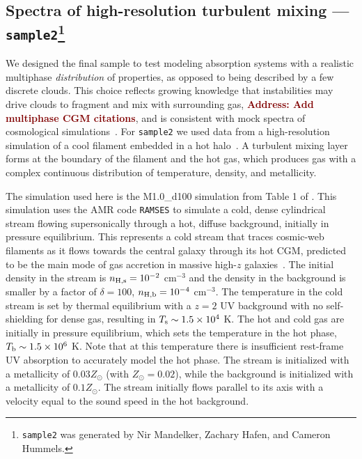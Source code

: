 \documentclass[fleqn,usenatbib]{mnras}
\newcommand{\todo}[1]{\textcolor{Maroon}{\textbf{Address: #1}}}
\begin{document}
\subsection[Spectra of high-resolution turbulent mixing --- \texttt{sample2}]{Spectra of high-resolution turbulent mixing --- \texttt{sample2}\footnote{
\texttt{sample2} was generated by Nir Mandelker, Zachary Hafen, and Cameron Hummels.}}
\label{s: data generation -- sample2}

We designed the final sample to test modeling absorption systems with a realistic multiphase \textit{distribution} of properties, as opposed to being described by a few discrete clouds.
This choice reflects growing knowledge that instabilities may drive clouds to fragment and mix with surrounding gas, \todo{Add multiphase CGM citations}, and is consistent with mock spectra of cosmological simulations~\citep[e.g.][]{Marra2022}.
For \texttt{sample2} we used data from a high-resolution simulation of a cool filament embedded in a hot halo~\citep{Mandelker2020a}.
A turbulent mixing layer forms at the boundary of the filament and the hot gas, which produces gas with a complex continuous distribution of temperature, density, and metallicity.

The simulation used here is the M1.0\_d100 simulation from Table 1 of \cite{Mandelker2020a}.
This simulation uses the AMR code \texttt{RAMSES} \citep{Teyssier2002} to simulate a cold, dense cylindrical stream flowing supersonically through a hot, diffuse background, initially in pressure equilibrium.
This represents a cold stream that traces cosmic-web filaments as it flows towards the central galaxy through its hot CGM, predicted to be the main mode of gas accretion in massive high-$z$ galaxies~\citep{Keres2009a, Dekel2009}.
The initial density in the stream is $n_{\rm H,s}=10^{-2}$ cm$^{-3}$ and the density in the background is smaller by a factor of $\delta=100$, $n_{\rm H,b}=10^{-4}$ cm$^{-3}$.
The temperature in the cold stream is set by thermal equilibrium with a $z=2$ \cite{Haardt1996} UV background with no self-shielding for dense gas, resulting in $T_{\rm s}\sim 1.5 \times 10^4$ K.
The hot and cold gas are initially in pressure equilibrium, which sets the temperature in the hot phase, $T_{\rm b}\sim 1.5 \times 10^6$ K.
Note that at this temperature there is insufficient rest-frame UV absorption to accurately model the hot phase.
The stream is initialized with a metallicity of $0.03 Z_\odot$ (with $Z_\odot = 0.02$), while the background is initialized with a metallicity of $0.1 Z_\odot$.
The stream initially flows parallel to its axis with a velocity equal to the sound speed in the hot background.
\end{document}
